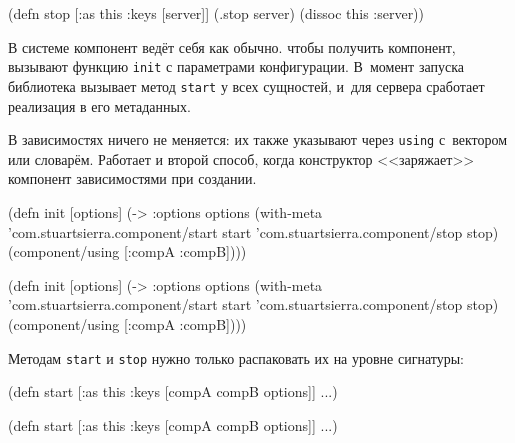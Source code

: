 \begin{english}
  \begin{clojure}
(defn stop
  [{:as this :keys [server]}]
  (.stop server)
  (dissoc this :server))
  \end{clojure}
\end{english}

В системе компонент ведёт себя как обычно. чтобы получить компонент, вызывают
функцию \verb|init| с параметрами конфигурации. В~момент запуска библиотека
вызывает метод \verb|start| у всех сущностей, и~для сервера сработает реализация
в его метаданных.

В зависимостях ничего не меняется: их также указывают через \verb|using|
с~вектором или словарём. Работает и второй способ, когда конструктор
<<заряжает>> компонент зависимостями при создании.

\ifnarrow

\begin{english}
  \begin{clojure}
(defn init [options]
  (->
    {:options options}
    (with-meta
     {'com.stuartsierra.component/start
      start
      'com.stuartsierra.component/stop
      stop})
    (component/using [:compA :compB])))
  \end{clojure}
\end{english}

\else

\begin{english}
  \begin{clojure}
(defn init [options]
  (-> {:options options}
      (with-meta
        {'com.stuartsierra.component/start start
         'com.stuartsierra.component/stop stop})
      (component/using [:compA :compB])))
  \end{clojure}
\end{english}

\fi

\noindent
Методам \verb|start| и \verb|stop| нужно только распаковать их на уровне
сигнатуры:

\ifnarrow

\begin{english}
  \begin{clojure}
(defn start
  [{:as this
    :keys [compA compB options]}]
  ...)
  \end{clojure}
\end{english}

\else

\begin{english}
  \begin{clojure}
(defn start
  [{:as this :keys [compA compB options]}]
  ...)
  \end{clojure}
\end{english}

